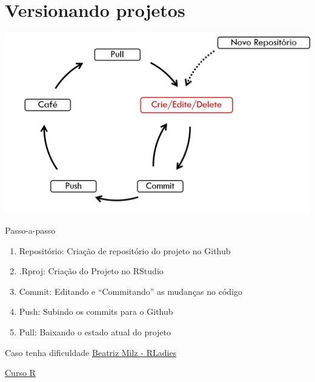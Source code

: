 \documentclass[
  9pt,
  ignorenonframetext,
]{beamer}
\begin{document}
\hypertarget{versionando-projetos}{%
\section{Versionando projetos}\label{versionando-projetos}}

\begin{frame}{}
\protect\hypertarget{section-1}{}
\begin{center}\includegraphics[width=0.8\linewidth]{imgs/fluxo_github_rstudio} \end{center}
\end{frame}

\begin{frame}{Passo-a-passo}
\protect\hypertarget{passo-a-passo}{}
\begin{enumerate}
\item
  Repositório: Criação de repositório do projeto no Github
\item
  .Rproj: Criação do Projeto no RStudio
\item
  Commit: Editando e ``Commitando'' as mudanças no código
\item
  Push: Subindo os commits para o Github
\item
  Pull: Baixando o estado atual do projeto
\end{enumerate}
\end{frame}

\begin{frame}{Caso tenha dificuldade}
\protect\hypertarget{caso-tenha-dificuldade}{}
\href{https://beatrizmilz.github.io/RLadies-Git-RStudio-2019/\#1}{Beatriz
Milz - RLadies}

\href{https://www.curso-r.com/blog/2017-07-17-rstudio-e-github/}{Curso
R}
\end{frame}
\end{document}
